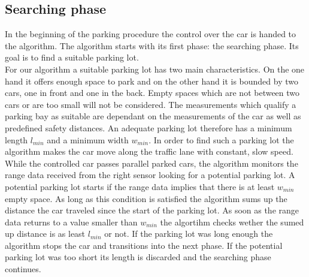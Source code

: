 \documentclass[paper=a4, fontsize=11pt]{scrreprt}
\begin{document}
\subsection{Searching phase} \label{seraching_phase}
In the beginning of the parking procedure the control over the car is handed to the algorithm. The algorithm starts with its first phase: the searching phase. Its goal is to find a suitable parking lot.\\
For our algorithm a suitable parking lot has two main characteristics. On the one hand it offers enough space to park and on the other hand it is bounded by two cars, one in front and one in the back. Empty spaces which are not between two cars or are too small will not be considered. The measurements which qualify a parking bay as suitable are dependant on the measurements of the car as well as predefined safety distances. An adequate parking lot therefore has a minimum length $l_{min}$ and a minimum width $w_{min}$. In order to find such a parking lot the algorithm makes the car move along the traffic lane with constant, slow  speed.  While the controlled car passes parallel parked cars, the algorithm monitors the range data received from the right sensor looking for a potential parking lot. A potential parking lot starts if the range data implies that there is at least $w_{min}$ empty space. As long as this condition is satisfied the algorithm sums up the distance the car traveled since the start of the parking lot. As soon as the range data returns to a value smaller than $w_{min}$ the algortihm checks wether the sumed up distance is as least $l_{min}$ or not. If the parking lot was long enough the algorithm stops the car and transitions into the next phase. If the potential parking lot was too short its length is discarded and the searching phase continues.
\end{document}
